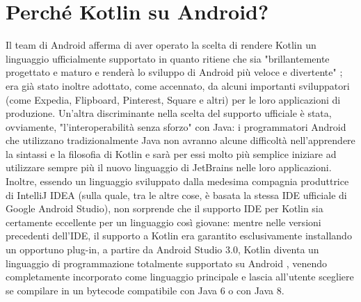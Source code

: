\section{Perché Kotlin su Android?}
Il team di Android afferma di aver operato la scelta di rendere Kotlin un linguaggio ufficialmente supportato in quanto ritiene che sia "brillantemente progettato e maturo e renderà lo sviluppo di Android più veloce e divertente" \cite{ktOnAndroidDevBlog}; era già stato inoltre adottato, come accennato, da alcuni importanti sviluppatori (come Expedia, Flipboard, Pinterest, Square e altri) per le loro applicazioni di produzione. Un'altra discriminante nella scelta del supporto ufficiale è stata, ovviamente, "l'interoperabilità senza sforzo" con Java: i programmatori Android che utilizzano tradizionalmente Java non avranno alcune difficoltà nell’apprendere la sintassi e la filosofia di Kotlin e sarà per essi molto più semplice iniziare ad utilizzare sempre più il nuovo linguaggio di JetBrains nelle loro applicazioni. Inoltre, essendo un linguaggio sviluppato dalla medesima compagnia produttrice di IntelliJ IDEA (sulla quale, tra le altre cose, è basata la stessa IDE ufficiale di Google Android Studio), non sorprende che il supporto IDE per Kotlin sia certamente eccellente per un linguaggio così giovane: mentre nelle versioni precedenti dell'IDE, il supporto a Kotlin era garantito esclusivamente installando un opportuno plug-in, a partire da Android Studio 3.0, Kotlin diventa un linguaggio di programmazione totalmente supportato su Android \cite{ktUpdateAndroidDevBlog}, venendo completamente incorporato come linguaggio principale e lascia all'utente scegliere se compilare in un bytecode compatibile con Java 6 o con Java 8.\\

